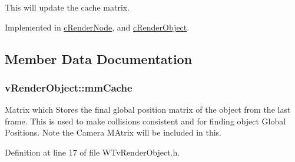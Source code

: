 This will update the cache matrix. 



Implemented in \hyperlink{classc_render_node_ad007ec73538353c0bc86a9629abdaaa4}{cRenderNode}, and \hyperlink{classc_render_object_aeeb8da742f1a844179a74a99e9aa4433}{cRenderObject}.



\subsection{Member Data Documentation}
\hypertarget{classv_render_object_a7ac4333806eaa793c4ce83e25764ad3b}{
\subsubsection[{mmCache}]{ {\bf vRenderObject::mmCache}}}
\label{classv_render_object_a7ac4333806eaa793c4ce83e25764ad3b}


Matrix which Stores the final global position matrix of the object from the last frame. This is used to make collisions consistent and for finding object Global Positions. Note the Camera MAtrix will be included in this. 



Definition at line 17 of file WTvRenderObject.h.

